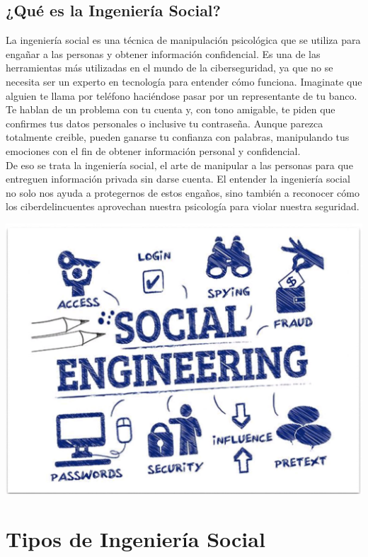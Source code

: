 \documentclass[12pt]{article}
\begin{document}
\subsection{¿Qué es la Ingeniería Social?}
\noindent
La ingeniería social es una técnica de manipulación psicológica que se utiliza para engañar a las personas y obtener información confidencial. Es una de las herramientas más utilizadas en el mundo de la ciberseguridad, ya que no se necesita ser un experto en tecnología para entender cómo funciona. Imaginate que alguien te llama por teléfono haciéndose pasar por un representante de tu banco. Te hablan de un problema con tu cuenta y, con tono amigable, te piden que confirmes tus datos personales o inclusive tu contraseña. Aunque parezca totalmente creible, pueden ganarse tu confianza con palabras, manipulando tus emociones con el fin de obtener información personal y confidencial.\\
De eso se trata la ingeniería social, el arte de manipular a las personas para que entreguen información privada sin darse cuenta. El entender la ingeniería social no solo nos ayuda a protegernos de estos engaños, sino también a reconocer cómo los ciberdelincuentes aprovechan nuestra psicología para violar nuestra seguridad.\\
\begin{center}
    \includegraphics[width=15cm]{ingsocial.png}
\end{center}

\newpage

\section{Tipos de Ingeniería Social}
\end{document}
